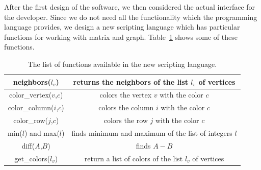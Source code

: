 \documentclass[12pt, twoside,a4paper,toc=bibliography]{scrbook}
\begin{document}
After the first design of the software, we then considered the actual interface
for the developer. Since we do not need all the functionality which the
programming language provides, we design a new scripting language which
has particular functions for working with matrix and graph.
Table~\ref{command-table} shows some of these functions.
\begin{table}
\begin{tabular}{ | c | c |}
\hline
neighbors($l_v$) & returns the neighbors of the list $l_v$ of vertices \\ \hline
color\_vertex($v$,$c$) & colors the vertex $v$ with the color $c$ \\\hline
color\_column($i$,$c$) & colors the column $i$ with the color $c$ \\\hline
color\_row($j$,$c$) & colors the row $j$ with the color $c$ \\\hline
min($l$) and max($l$) & finds minimum and maximum of the list of integers $l$ \\\hline
diff($A$,$B$) & finds $A - B$ \\\hline
get\_colors($l_v$) & return a list of colors of the list $l_v$ of vertices\\\hline
\end{tabular}
\caption{The list of functions available in the new scripting language.}
\label{command-table}
\end{table}
\end{document}
